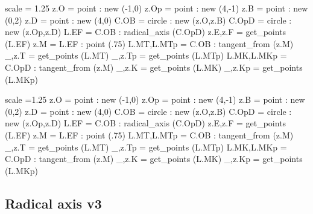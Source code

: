 \begin{tkzexample}[latex=0cm,small,code only]
\begin{tkzelements}
scale       = 1.25
z.O         = point : new (-1,0)
z.Op        = point : new (4,-1)
z.B         = point : new (0,2)
z.D         = point : new (4,0)
C.OB        = circle :    new (z.O,z.B)
C.OpD       = circle :    new (z.Op,z.D)
L.EF        = C.OB : radical_axis (C.OpD)
z.E,z.F     = get_points (L.EF)
z.M         = L.EF : point (.75)
L.MT,L.MTp  = C.OB : tangent_from (z.M)
_,z.T       = get_points (L.MT)
_,z.Tp      = get_points (L.MTp)
L.MK,L.MKp  = C.OpD : tangent_from (z.M)
_,z.K       = get_points (L.MK)
_,z.Kp      = get_points (L.MKp)
\end{tkzelements}
\end{tkzexample}

\begin{tkzelements}
scale =1.25
z.O     = point : new (-1,0)
z.Op    = point : new (4,-1)
z.B     = point : new (0,2)
z.D     = point : new (4,0)
C.OB    = circle :    new (z.O,z.B)
C.OpD   = circle :    new (z.Op,z.D)
L.EF    = C.OB : radical_axis (C.OpD)
z.E,z.F = get_points (L.EF)
z.M     = L.EF : point (.75)
L.MT,L.MTp  = C.OB : tangent_from (z.M)
_,z.T = get_points (L.MT)
_,z.Tp = get_points (L.MTp)
L.MK,L.MKp  = C.OpD : tangent_from (z.M)
_,z.K = get_points (L.MK)
_,z.Kp = get_points (L.MKp)
\end{tkzelements}
\hspace*{\fill}
\hspace*{\fill}

\subsection{Radical axis v3} %
\label{sub:radical_axis_v3}

